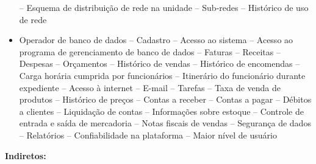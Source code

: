 \begin{itemize}
		\subitem -- Esquema de distribuição de rede na unidade
		\subitem -- Sub-redes
		\subitem -- Histórico de uso de rede
	\item Operador de banco de dados
		\subitem -- Cadastro
		\subitem -- Acesso ao sistema
		\subitem -- Acesso ao programa de gerenciamento de banco de dados
		\subitem -- Faturas
		\subitem -- Receitas
		\subitem -- Despesas
		\subitem -- Orçamentos
		\subitem -- Histórico de vendas
		\subitem -- Histórico de encomendas
		\subitem -- Carga horária cumprida por funcionários
		\subitem -- Itinerário do funcionário durante expediente 
		\subitem -- Acesso à internet
		\subitem -- E-mail
		\subitem -- Tarefas
		\subitem -- Taxa de venda de produtos
		\subitem -- Histórico de preços
		\subitem -- Contas a receber
		\subitem -- Contas a pagar
		\subitem -- Débitos a clientes
		\subitem -- Liquidação de contas
		\subitem -- Informações sobre estoque
		\subitem -- Controle de entrada e saída de mercadoria 
		\subitem -- Notas fiscais de vendas
		\subitem -- Segurança de dados
		\subitem -- Relatórios
		\subitem -- Confiabilidade na plataforma
		\subitem -- Maior nível de usuário
\end{itemize}
\textbf{Indiretos:}
